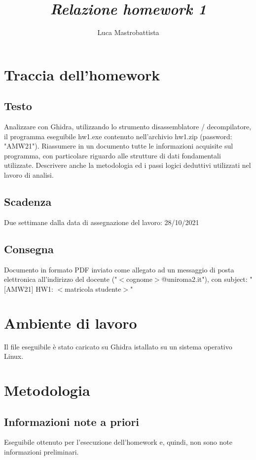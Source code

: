 \documentclass[a4paper, 12pt]{article}
\begin{document}
\sloppy
  
\title{
  \textbf{
    \emph{Relazione homework 1}
  }
}  
\author{Luca Mastrobattista}
\date{}
\maketitle

\tableofcontents

\newpage
\section{Traccia dell'homework}
\subsection{Testo}
Analizzare con Ghidra, utilizzando lo strumento 
disassemblatore / decompilatore, il programma eseguibile
hw1.exe contenuto nell'archivio hw1.zip (password: "AMW21").
Riassumere in un documento tutte le informazioni acquisite
sul programma, con particolare riguardo alle strutture di
dati fondamentali utilizzate.
Descrivere anche la metodologia ed i passi logici deduttivi
utilizzati nel lavoro di analisi.
\subsection{Scadenza}
Due settimane dalla data di assegnazione del lavoro: 28/10/2021
\subsection{Consegna}
Documento in formato PDF inviato come allegato ad
un messaggio di posta elettronica all'indirizzo del docente
("$<$cognome$>$@uniroma2.it"), con subject:
"[AMW21] HW1: $<$matricola studente$>$"

\newpage
\section{Ambiente di lavoro}
Il file eseguibile è stato caricato su Ghidra istallato su un sistema operativo Linux. 

\newpage
\section{Metodologia}

\subsection{Informazioni note a priori}
Eseguibile ottenuto per l'esecuzione dell'homework e, quindi, non sono note informazioni preliminari.
\end{document}
